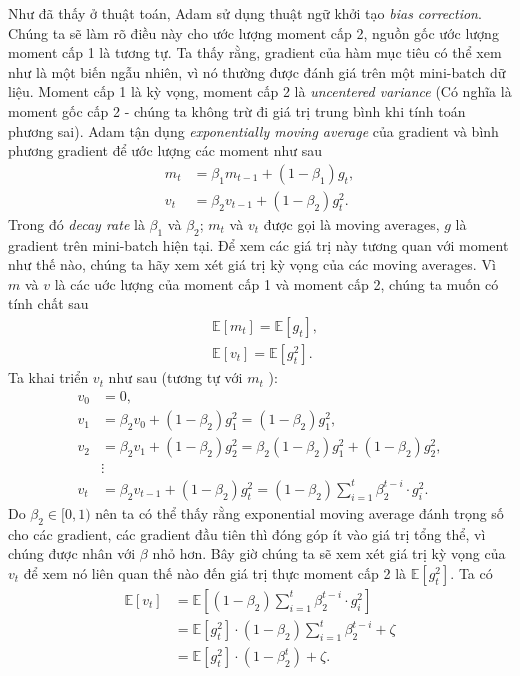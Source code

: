 \documentclass[11pt,oneside,a4paper]{report}
\theoremstyle{definition}
\begin{document}
Như đã thấy ở thuật toán, Adam sử dụng thuật ngữ khởi tạo \textit{bias correction}. Chúng ta sẽ làm rõ điều này cho ước lượng moment cấp 2, nguồn gốc ước lượng moment cấp 1 là tương tự.
Ta thấy rằng, gradient của hàm mục tiêu có thể xem như là một biến ngẫu nhiên, vì nó thường được đánh giá trên một mini-batch dữ liệu. Moment cấp 1 là kỳ vọng, moment cấp 2 là \textit{uncentered variance} (Có nghĩa là moment gốc cấp 2 - chúng ta không trừ đi giá trị trung bình khi tính toán phương sai). Adam tận dụng \textit{exponentially moving average} của gradient và bình phương gradient để ước lượng các moment như sau
$$
\begin{aligned}
m_t &=\beta_1 m_{t-1}+\left(1-\beta_1\right) g_t, \\
v_t &=\beta_2 v_{t-1}+\left(1-\beta_2\right) g_t^2.
\end{aligned}
$$
Trong đó \textit{decay rate} là $\beta_1$ và $\beta_2$; $m_t$ và $v_t$ được gọi là moving averages, $g$ là gradient trên mini-batch hiện tại. Để xem các giá trị này tương quan với moment như thế nào, chúng ta hãy xem xét giá trị kỳ vọng của các moving averages. Vì $m$ và $v$ là các uớc lượng của moment cấp 1 và moment cấp 2, chúng ta muốn có tính chất sau
$$
\begin{aligned}
&\mathbb{E}\left[m_t\right]=\mathbb{E}\left[g_t\right],\\
&\mathbb{E}\left[v_t\right]=\mathbb{E}\left[g_t^2\right].
\end{aligned}
$$
Ta khai triển $v_t$ như sau (tương tự với $m_t$ ):
$$
\begin{aligned}
v_0 &=0, \\
v_1 &=\beta_2 v_0+\left(1-\beta_2\right) g_1^2=\left(1-\beta_2\right) g_1^2 ,\\
v_2 &=\beta_2 v_1+\left(1-\beta_2\right) g_2^2=\beta_2\left(1-\beta_2\right) g_1^2+\left(1-\beta_2\right) g_2^2,\\
&\vdots\\
v_t &=\beta_2 v_{t-1}+\left(1-\beta_2\right) g_t^2=\left(1-\beta_2\right) \sum_{i=1}^t \beta_2^{t-i} \cdot g_i^2.
\end{aligned}
$$
Do $\beta_2 \in[0,1)$ nên ta có thể thấy rằng exponential moving average đánh trọng số cho các gradient, các gradient đầu tiên thì đóng góp ít vào giá trị tổng thể, vì chúng được nhân với $\beta$ nhỏ hơn. Bây giờ chúng ta sẽ xem xét giá trị kỳ vọng của $v_t$ để xem nó liên quan thế nào đến giá trị thực moment cấp 2 là $\mathbb{E}\left[g_t^2\right]$. Ta có
$$
\begin{aligned}
\mathbb{E}\left[v_t\right] &=\mathbb{E}\left[\left(1-\beta_2\right) \sum_{i=1}^t \beta_2^{t-i} \cdot g_i^2\right] \\
&=\mathbb{E}\left[g_t^2\right] \cdot\left(1-\beta_2\right) \sum_{i=1}^t \beta_2^{t-i}+\zeta \\
&=\mathbb{E}\left[g_t^2\right] \cdot\left(1-\beta_2^t\right)+\zeta.
\end{aligned}
$$
\end{document}
